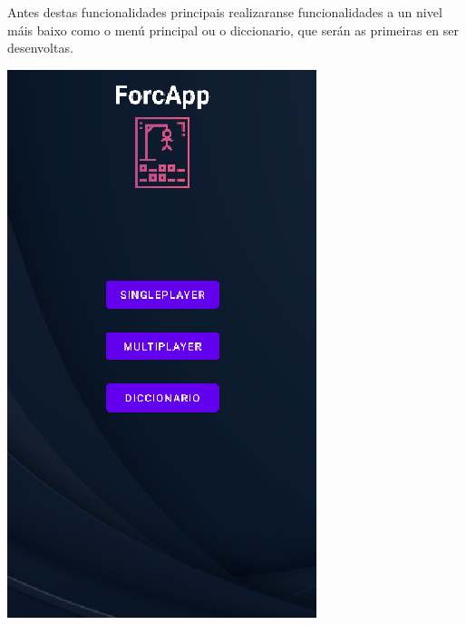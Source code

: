 Antes destas funcionalidades principais realizaranse funcionalidades a un nivel máis baixo como o menú principal ou o diccionario, que serán as primeiras en ser desenvoltas. \\
\begin{center}
\includegraphics[scale=0.53]{imaxes/menu.png}

\end{center}
